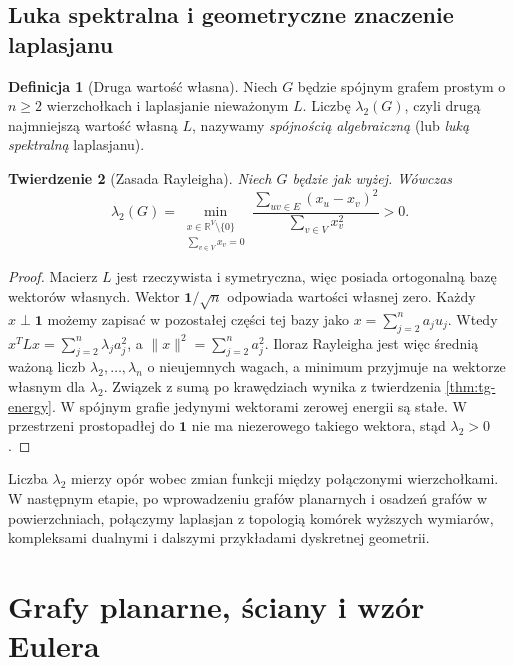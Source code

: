 \documentclass[11pt,a4paper]{report}
\numberwithin{equation}{section}
\theoremstyle{plain}
\newtheorem{twierdzenie}{Twierdzenie}[section]
\theoremstyle{definition}
\newtheorem{definicja}[twierdzenie]{Definicja}
\theoremstyle{remark}
\begin{document}
\section{Luka spektralna i geometryczne znaczenie laplasjanu}
\label{sec:tg-spectral-gap}

\begin{definicja}[Druga wartość własna]
Niech $G$ będzie spójnym grafem prostym o $n\ge2$
wierzchołkach i laplasjanie nieważonym $L$.
Liczbę $\lambda_2(G)$, czyli drugą najmniejszą
wartość własną $L$, nazywamy \emph{spójnością algebraiczną}
(lub \emph{luką spektralną} laplasjanu).
\end{definicja}

\begin{twierdzenie}[Zasada Rayleigha]
Niech $G$ będzie jak wyżej. Wówczas
\[
\lambda_2(G)=\min_{\substack{x\in\mathbb R^V\setminus\{0\}\\
               \sum_{v\in V}x_v=0}}
\frac{\sum_{uv\in E}(x_u-x_v)^2}{\sum_{v\in V}x_v^2}>0.
\]
\end{twierdzenie}

\begin{proof}
Macierz $L$ jest rzeczywista i symetryczna, więc posiada
ortogonalną bazę wektorów własnych. Wektor
$\mathbf1/\sqrt n$ odpowiada wartości własnej zero.
Każdy $x\perp\mathbf1$ możemy zapisać w pozostałej
części tej bazy jako $x=\sum_{j=2}^na_ju_j$.
Wtedy $x^TLx=\sum_{j=2}^n\lambda_ja_j^2$,
a $\|x\|^2=\sum_{j=2}^na_j^2$.
Iloraz Rayleigha jest więc średnią ważoną liczb
$\lambda_2,\ldots,\lambda_n$ o nieujemnych wagach,
a minimum przyjmuje na wektorze własnym dla
$\lambda_2$. Związek z sumą po krawędziach wynika
z twierdzenia \ref{thm:tg-energy}.
W spójnym grafie jedynymi wektorami zerowej energii
są stałe. W przestrzeni prostopadłej do $\mathbf1$
nie ma niezerowego takiego wektora, stąd $\lambda_2>0$.
\end{proof}

Liczba $\lambda_2$ mierzy opór wobec zmian funkcji między
połączonymi wierzchołkami. W następnym etapie, po wprowadzeniu
grafów planarnych i osadzeń grafów w powierzchniach,
połączymy laplasjan z topologią komórek wyższych wymiarów,
kompleksami dualnymi i dalszymi przykładami dyskretnej geometrii.

\chapter{Grafy planarne, ściany i wzór Eulera}
\label{ch:tg-planarne}
\end{document}
